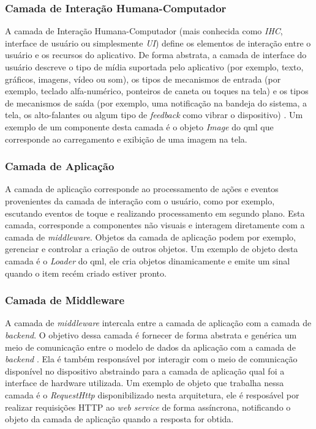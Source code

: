 \subsubsection{Camada de Interação Humana-Computador}
A camada de Interação Humana-Computador (mais conhecida como \textit{IHC}, interface de usuário ou simplesmente \textit{UI}) define os elementos de interação entre o usuário e os recursos do aplicativo. De forma abstrata, a camada de interface do usuário descreve o tipo de mídia suportada pelo aplicativo (por exemplo, texto, gráficos, imagens, vídeo ou som), os tipos de mecanismos de entrada (por exemplo, teclado alfa-numérico, ponteiros de caneta ou toques na tela) e os tipos de mecanismos de saída (por exemplo, uma notificação na bandeja do sistema, a tela, os alto-falantes ou algum tipo de \textit{feedback} como vibrar o dispositivo) \cite{Pabllo:2008:MMA:1621087.1621128}. Um exemplo de um componente desta camada é o objeto \textit{Image} do qml que corresponde ao carregamento e exibição de uma imagem na tela.

\subsubsection{Camada de Aplicação}
A camada de aplicação corresponde ao processamento de ações e eventos provenientes da camada de interação com o usuário, como por exemplo, escutando eventos de toque e realizando processamento em segundo plano. Esta camada, corresponde a componentes não visuais e interagem diretamente com a camada de \textit{middleware}. Objetos da camada de aplicação podem por exemplo, gerenciar e controlar a criação de outros objetos. Um exemplo de objeto desta camada é o \textit{Loader} do qml, ele cria objetos dinamicamente e emite um sinal quando o item recém criado estiver pronto.

\subsubsection{Camada de Middleware}
A camada de \textit{middleware} intercala entre a camada de aplicação com a camada de \textit{backend}. O objetivo dessa camada é fornecer de forma abstrata e genérica um meio de comunicação entre o modelo de dados da aplicação com a camada de \textit{backend} \cite{Pabllo:2008:MMA:1621087.1621128}. Ela é também responsável por interagir com o meio de comunicação disponível no dispositivo abstraindo para a camada de aplicação qual foi a interface de hardware utilizada. Um exemplo de objeto que trabalha nessa camada é o \textit{RequestHttp} disponibilizado nesta arquitetura, ele é resposável por realizar requisições HTTP ao \textit{web service} de forma assíncrona, notificando o objeto da camada de aplicação quando a resposta for obtida.

